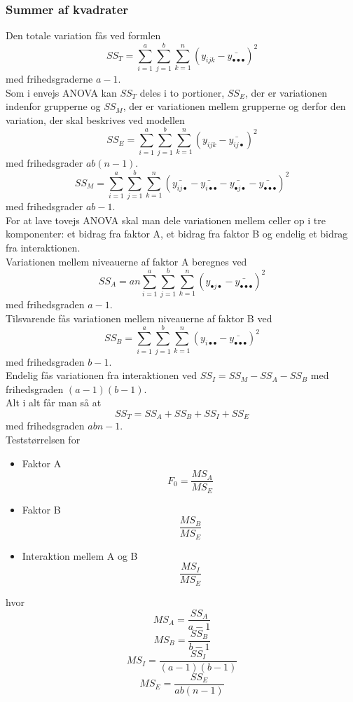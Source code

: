 \documentclass[11pt]{article}
\begin{document}
\subsubsection{Summer af kvadrater}
Den totale variation fås ved formlen
$$SS_T=\sum_{i=1}^a\sum_{j=1}^b\sum_{k=1}^n(y_{ijk}-\bar{y_{\bullet\bullet\bullet}})^2$$
med frihedsgraderne $a-1$.\\[0.2cm]
Som i envejs ANOVA kan $SS_T$ deles i to portioner, $SS_E$, der er variationen indenfor grupperne og $SS_M$, der er variationen mellem grupperne og derfor den variation, der skal beskrives ved modellen
$$SS_E=\sum_{i=1}^a\sum_{j=1}^b\sum_{k=1}^n(y_{ijk}-\bar{y_{ij\bullet}})^2$$
med frihedsgrader $ab(n-1)$.
$$SS_M=\sum_{i=1}^a\sum_{j=1}^b\sum_{k=1}^n(\bar{y_{ij\bullet}}-\bar{y_{i\bullet\bullet}}-\bar{y_{\bullet j\bullet}}-\bar{y_{\bullet\bullet\bullet}})^2$$
med frihedsgrader $ab-1$.\\[0.2cm]
For at lave tovejs ANOVA skal man dele variationen mellem celler op i tre komponenter: et bidrag fra faktor A, et bidrag fra faktor B og endelig et bidrag fra interaktionen.\\[0.2cm]
Variationen mellem niveauerne af faktor A beregnes ved
$$SS_A=an\sum_{i=1}^a\sum_{j=1}^b\sum_{k=1}^n(y_{\bullet j\bullet}-\bar{y_{\bullet\bullet\bullet}})^2$$
med frihedsgraden $a-1$. \\[0.2cm]
Tilsvarende fås variationen mellem niveauerne af faktor B ved
$$SS_B=\sum_{i=1}^a\sum_{j=1}^b\sum_{k=1}^n(y_{i\bullet\bullet}-\bar{y_{\bullet\bullet\bullet}})^2$$
med frihedsgraden $b-1$. \\[0.2cm]
Endelig fås variationen fra interaktionen ved
$SS_I=SS_M-SS_A-SS_B$
med frihedsgraden $(a-1)(b-1)$. \\[0.2cm]
Alt i alt får man så at
$$SS_T=SS_A+SS_B+SS_I+SS_E$$
med frihedsgraden $abn-1$. \\[0.2cm]
Teststørrelsen for
\begin{itemize}\itemsep-2pt
\item Faktor A
$$F_0=\frac{MS_A}{MS_E}$$
\item Faktor B
$$\frac{MS_B}{MS_E}$$
\item Interaktion mellem A og B
$$\frac{MS_{I}}{MS_E}$$
\end{itemize}
hvor 
$$MS_A=\frac{SS_A}{a-1}$$
$$MS_B=\frac{SS_B}{b-1}$$
$$MS_I=\frac{SS_I}{(a-1)(b-1)}$$
$$MS_E=\frac{SS_E}{ab(n-1)}$$
\end{document}
